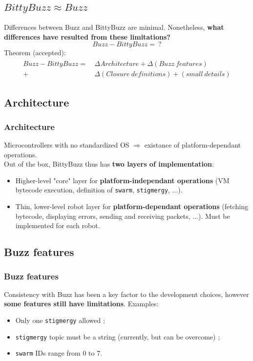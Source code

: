 \documentclass{beamer}
\begin{document}
	\begin{frame}
		\section{$BittyBuzz \approx Buzz$}
		Differences between Buzz and BittyBuzz are minimal. Nonetheless, \textbf{what differences have resulted from these limitations?}\\
		\[Buzz - BittyBuzz =~?\]
		Theorem (accepted):
		\begin{align}
		\begin{split}
		Buzz - BittyBuzz = ~&\Delta Architecture + \Delta (Buzz~features)\\
		+ &\Delta (Closure~definitions) + (small~details)
		\end{split}
		\end{align}
	\end{frame}
	\begin{frame}
		\subsection{Architecture}
		\frametitle{Architecture}
		Microcontrollers with no standardized OS $\Rightarrow$ existance of platform-dependant operations.\\
		Out of the box, BittyBuzz thus has \textbf{two layers of implementation}:
		\begin{itemize}
			\item Higher-level "core" layer for \textbf{platform-independant operations} (VM bytecode execution, definition of \texttt{swarm}, \texttt{stigmergy}, ...).
			\item Thin, lower-level robot layer for \textbf{platform-dependant operations} (fetching bytecode, displaying errors, sending and receiving packets, ...). Must be implemented for each robot.
		\end{itemize}
	\end{frame}
	\begin{frame}
		\subsection{Buzz features}
		\frametitle{Buzz features}
		Consistency with Buzz has been a key factor to the development choices, however \textbf{some features still have limitations}. Examples:
		\begin{itemize}
			\item Only one \texttt{stigmergy} allowed ;
			\item \texttt{stigmergy} topic must be a string (currently, but can be overcome) ;
			\item \texttt{swarm} IDs range from 0 to 7.
		\end{itemize}
	\end{frame}
\end{document}
